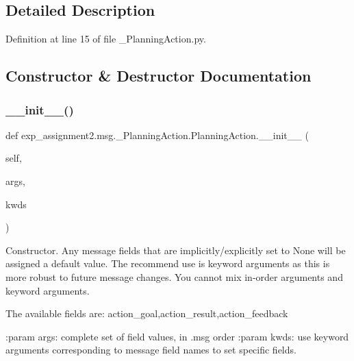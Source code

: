 \subsection{Detailed Description}


Definition at line 15 of file \+\_\+\+Planning\+Action.\+py.



\subsection{Constructor \& Destructor Documentation}
\mbox{\label{classexp__assignment2_1_1msg_1_1__PlanningAction_1_1PlanningAction_a97a18344111d391b89ba90aeb2ce1c8f}} 
\subsubsection{\texorpdfstring{\+\_\+\+\_\+init\+\_\+\+\_\+()}{\_\_init\_\_()}}
{\footnotesize\ttfamily def exp\+\_\+assignment2.\+msg.\+\_\+\+Planning\+Action.\+Planning\+Action.\+\_\+\+\_\+init\+\_\+\+\_\+ (\begin{DoxyParamCaption}\item[{}]{self,  }\item[{}]{args,  }\item[{}]{kwds }\end{DoxyParamCaption})}

\begin{DoxyVerb}Constructor. Any message fields that are implicitly/explicitly
set to None will be assigned a default value. The recommend
use is keyword arguments as this is more robust to future message
changes.  You cannot mix in-order arguments and keyword arguments.

The available fields are:
   action_goal,action_result,action_feedback

:param args: complete set of field values, in .msg order
:param kwds: use keyword arguments corresponding to message field names
to set specific fields.
\end{DoxyVerb}
 

